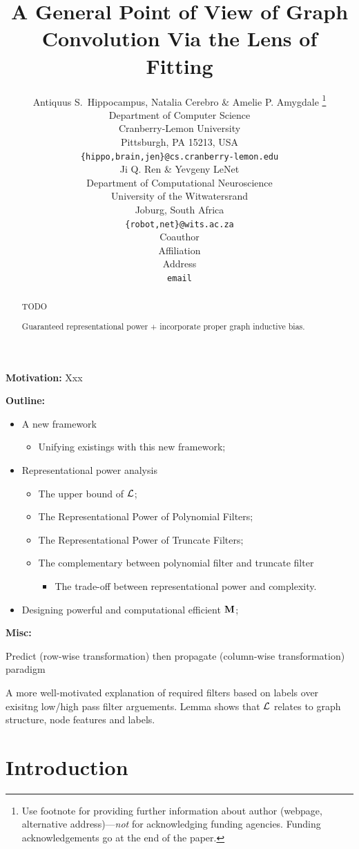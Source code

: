 \documentclass{article} %
\title{A General Point of View of Graph Convolution Via the Lens of Fitting}
\author{Antiquus S.~Hippocampus, Natalia Cerebro \& Amelie P. Amygdale \thanks{ Use footnote for providing further information
		about author (webpage, alternative address)---\emph{not} for acknowledging
		funding agencies.  Funding acknowledgements go at the end of the paper.} \\
	Department of Computer Science\\
	Cranberry-Lemon University\\
	Pittsburgh, PA 15213, USA \\
	\texttt{\{hippo,brain,jen\}@cs.cranberry-lemon.edu} \\
	\And
	Ji Q. Ren \& Yevgeny LeNet \\
	Department of Computational Neuroscience \\
	University of the Witwatersrand \\
	Joburg, South Africa \\
	\texttt{\{robot,net\}@wits.ac.za} \\
	\AND
	Coauthor \\
	Affiliation \\
	Address \\
	\texttt{email}
}
\begin{document}
	
	\maketitle
	
	\begin{abstract}
		TODO
		
		Guaranteed representational power + incorporate proper graph inductive bias.
	\end{abstract}
	
	{\color{orange}
		\textbf{Motivation:}
		Xxx
	}
	
	{\color{blue}
		\textbf{Outline:}
		\begin{itemize}
			\item
			A new framework
			\begin{itemize}
				\item
				Unifying existings with this new framework;
			\end{itemize}
			\item
			Representational power analysis
			\begin{itemize}
				\item
				The upper bound of ${\mathcal{L}}$;
				\item
				The Representational Power of Polynomial Filters;
				\item
				The Representational Power of Truncate Filters;
				\item
				The complementary between polynomial filter and truncate filter
				\begin{itemize}
					\item
					The trade-off between representational power and complexity.
				\end{itemize}
			\end{itemize}
			\item
			Designing powerful and computational efficient ${\mathbf{M}}$;
		\end{itemize}
	}
	
	{\color{purple}
		\textbf{Misc:}
		
		Predict (row-wise transformation) then propagate (column-wise transformation) paradigm
		
		A more well-motivated explanation of required filters based on labels over exisitng low/high pass filter arguements.
		Lemma shows that ${\mathcal{L}}$ relates to graph structure, node features and labels.
	}
	
	\section{Introduction}
	
\end{document}
